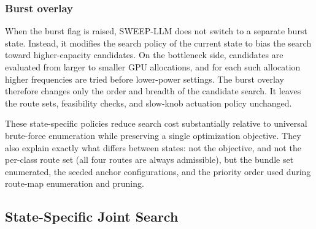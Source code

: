 \subsubsection*{\textnormal{ Burst overlay}}
When the burst flag is raised, SWEEP-LLM does not switch to a separate burst state.
Instead, it modifies the search policy of the current state to bias the search toward higher-capacity candidates.
On the bottleneck side, candidates are evaluated from larger to smaller GPU allocations, and for each such allocation higher frequencies are tried before lower-power settings.
The burst overlay therefore changes only the order and breadth of the candidate search.
It leaves the route sets, feasibility checks, and slow-knob actuation policy unchanged.

These state-specific policies reduce search cost substantially relative to universal brute-force enumeration while preserving a single optimization objective.
They also explain exactly what differs between states: not the objective, and not the per-class route set (all four routes are always admissible), but the bundle set enumerated, the seeded anchor configurations, and the priority order used during route-map enumeration and pruning.

\fi

\subsection{State-Specific Joint Search}
\label{sec:joint_search}

